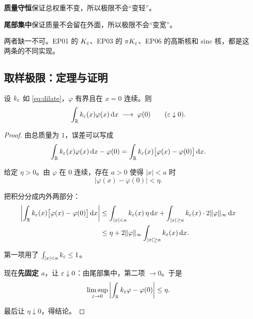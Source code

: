\begin{ideabox}[这两条各自管什么]
\textbf{质量守恒}保证总权重不变，所以极限不会“变轻”。

\textbf{尾部集中}保证质量不会留在外面，所以极限不会“变宽”。

两者缺一不可。EP01 的 $K_\varepsilon$、EP03 的 $\pi K_\varepsilon$、EP06 的高斯核和 sinc 核，都是这两条的不同实现。
\end{ideabox}

\subsection{取样极限：定理与证明}

\begin{thm}[取样极限]\label{thm:sampling}
设 $k_\varepsilon$ 如 \eqref{eq:dilate}，$\varphi$ 有界且在 $x=0$ 连续。则
\begin{equation}
\int_{\mathbb{R}}k_\varepsilon(x)\varphi(x)\mathop{}\!\mathrm{d} x\;\longrightarrow\;\varphi(0)
\qquad(\varepsilon\downarrow0).
\end{equation}
\end{thm}

\begin{proof}
由总质量为 $1$，误差可以写成
\begin{equation}
\int_{\mathbb{R}}k_\varepsilon(x)\varphi(x)\mathop{}\!\mathrm{d} x-\varphi(0)
=\int_{\mathbb{R}}k_\varepsilon(x)\big[\varphi(x)-\varphi(0)\big]\mathop{}\!\mathrm{d} x .
\end{equation}

给定 $\eta>0$。由 $\varphi$ 在 $0$ 连续，存在 $a>0$ 使得 $|x|<a$ 时
\begin{equation}
|\varphi(x)-\varphi(0)|<\eta .
\end{equation}

把积分分成内外两部分：
\begin{align}
\left|\int_{\mathbb{R}}k_\varepsilon(x)\big[\varphi(x)-\varphi(0)\big]\mathop{}\!\mathrm{d} x\right|
&\le\int_{|x|<a}k_\varepsilon(x)\,\eta\mathop{}\!\mathrm{d} x
+\int_{|x|\ge a}k_\varepsilon(x)\cdot2\|\varphi\|_\infty\mathop{}\!\mathrm{d} x \notag\\
&\le \eta+2\|\varphi\|_\infty\int_{|x|\ge a}k_\varepsilon(x)\mathop{}\!\mathrm{d} x .
\end{align}

第一项用了 $\int_{|x|<a}k_\varepsilon\le1$。

现在\textbf{先固定 $a$}，让 $\varepsilon\downarrow0$：由尾部集中，第二项 $\to0$。于是
\begin{equation}
\limsup_{\varepsilon\to0}\left|\int_{\mathbb{R}}k_\varepsilon\varphi-\varphi(0)\right|\le\eta .
\end{equation}

最后让 $\eta\downarrow0$，得结论。
\end{proof}

